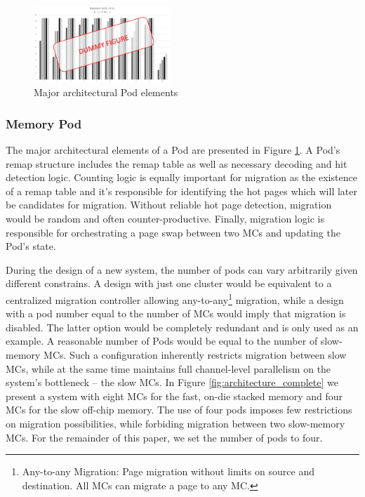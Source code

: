 \begin{figure}[h]
  \includegraphics[width=0.46\textwidth]{figures/dummy.pdf}
  \caption{Major architectural Pod elements}
  \label{fig:architecture_pod}
\end{figure}

\subsubsection*{Memory Pod}
The major architectural elements of a Pod are presented in Figure \ref{fig:architecture_pod}. A Pod's remap structure includes the remap table as well as necessary decoding and hit detection logic. Counting logic is equally important for migration as the existence of a remap table and it's responsible for identifying the hot pages which will later be candidates for migration. Without reliable hot page detection, migration would be random and often counter-productive. Finally, migration logic is responsible for orchestrating a page swap between two MCs and updating the Pod's state.

During the design of a new system, the number of pods can vary arbitrarily given different constrains. A design with just one cluster would be equivalent to a centralized migration controller allowing any-to-any\footnote{Any-to-any Migration: Page migration without limits on source and destination. All MCs can migrate a page to any MC.} migration, while a design with a pod number equal to the number of MCs would imply that migration is disabled. The latter option would be completely redundant and is only used as an example. A reasonable number of Pods would be equal to the number of slow-memory MCs. Such a configuration inherently restricts migration between slow MCs, while at the same time maintains full channel-level parallelism on the system's bottleneck -- the slow MCs. In Figure \ref{fig:architecture_complete} we present a system with eight MCs for the fast, on-die stacked memory and four MCs for the slow off-chip memory. The use of four pods imposes few restrictions on migration possibilities, while forbiding migration between two slow-memory MCs. For the remainder of this paper, we set the number of pods to four.

